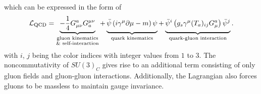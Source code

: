 \documentclass[../thesis.tex]{subfiles}
\begin{document}
which can be expressed in the form of
\begin{equation}
\mathcal{L}_\mathrm{QCD} = 
\underbrace{
-\frac{1}{4} G_{\mu \nu}^a G_a^{\mu \nu}
}_{\substack{\text{gluon kinematics}\\ \text{\& self-interaction}}}
+\underbrace{\vphantom{\frac{1}{4}}
\bar{\psi}\left( i\gamma^\mu \partial\mu-m \right)\psi
}_\text{quark kinematics}
+\underbrace{\vphantom{\frac{1}{4}}
\bar{\psi}^i\left( g_s \gamma^\mu (T_a)_{ij} G^a_\mu \right)\bar{\psi}^j
}_\text{quark-gluon interaction}.
\end{equation}
with $i$, $j$ being the color indices with integer values from $1$ to $3$. The noncommutativity of $SU(3)_C$ gives rise to an additional term consisting of only gluon fields and gluon-gluon interactions. Additionally, the Lagrangian also forces gluons to be massless to maintain gauge invariance.
\end{document}
